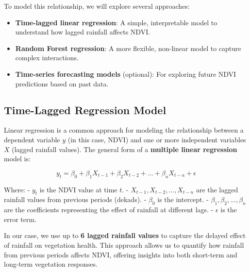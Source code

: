 \documentclass[
]{article}
\providecommand{\tightlist}{%
  \setlength{\itemsep}{0pt}\setlength{\parskip}{0pt}}
\begin{document}
To model this relationship, we will explore several approaches:

\begin{itemize}
\tightlist
\item
  \textbf{Time-lagged linear regression}: A simple, interpretable model
  to understand how lagged rainfall affects NDVI.
\item
  \textbf{Random Forest regression}: A more flexible, non-linear model
  to capture complex interactions.
\item
  \textbf{Time-series forecasting models} (optional): For exploring
  future NDVI predictions based on past data.
\end{itemize}

\subsection{Time-Lagged Regression
Model}\label{time-lagged-regression-model}

Linear regression is a common approach for modeling the relationship
between a dependent variable \(y\) (in this case, NDVI) and one or more
independent variables \(X\) (lagged rainfall values). The general form
of a \textbf{multiple linear regression} model is:

\[
y_t = \beta_0 + \beta_1 X_{t-1} + \beta_2 X_{t-2} + ... + \beta_n X_{t-n} + \epsilon
\]

Where: - \(y_t\) is the NDVI value at time \(t\). -
\(X_{t-1}, X_{t-2}, ..., X_{t-n}\) are the lagged rainfall values from
previous periods (dekads). - \(\beta_0\) is the intercept. -
\(\beta_1, \beta_2, ..., \beta_n\) are the coefficients representing the
effect of rainfall at different lags. - \(\epsilon\) is the error term.

In our case, we use up to \textbf{6 lagged rainfall values} to capture
the delayed effect of rainfall on vegetation health. This approach
allows us to quantify how rainfall from previous periods affects NDVI,
offering insights into both short-term and long-term vegetation
responses.
\end{document}
